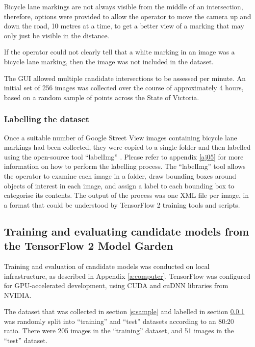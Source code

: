 \documentclass[11pt,twoside]{report}
\begin{document}
Bicycle lane markings are not always visible from the middle of an intersection, therefore, options were provided to allow the operator to move the camera up and down the road, 10 metres at a time, to get a better view of a marking that may only just be visible in the distance.

If the operator could not clearly tell that a white marking in an image was a bicycle lane marking, then the image was not included in the dataset.

The GUI allowed multiple candidate intersections to be assessed per minute.  An initial set of 256 images was collected over the course of approximately 4 hours, based on a random sample of points across the State of Victoria.


\subsubsection{Labelling the dataset}
\label{s:label}

Once a suitable number of Google Street View images containing bicycle lane markings had been collected, they were copied to a single folder and then labelled using the open-source tool ``labelImg'' \cite{labelImg}.  Please refer to appendix \ref{aj05} for more information on how to perform the labelling process.  The ``labelImg'' tool allows the operator to examine each image in a folder, draw bounding boxes around objects of interest in each image, and assign a label to each bounding box to categorise its contents.  The output of the process was one XML file per image, in a format that could be understood by TensorFlow 2 training tools and scripts.

\subsection{Training and evaluating candidate models from the TensorFlow 2 Model Garden}

Training and evaluation of candidate models was conducted on local infrastructure, as described in Appendix \ref{a:computer}.  TensorFlow was configured for GPU-accelerated development, using CUDA and cuDNN libraries from NVIDIA.

The dataset that was collected in section \ref{s:sample} and labelled in section \ref{s:label} was randomly split into ``training'' and ``test'' datasets according to an 80:20 ratio.  There were 205 images in the ``training'' dataset, and 51 images in the ``test'' dataset.
\end{document}
